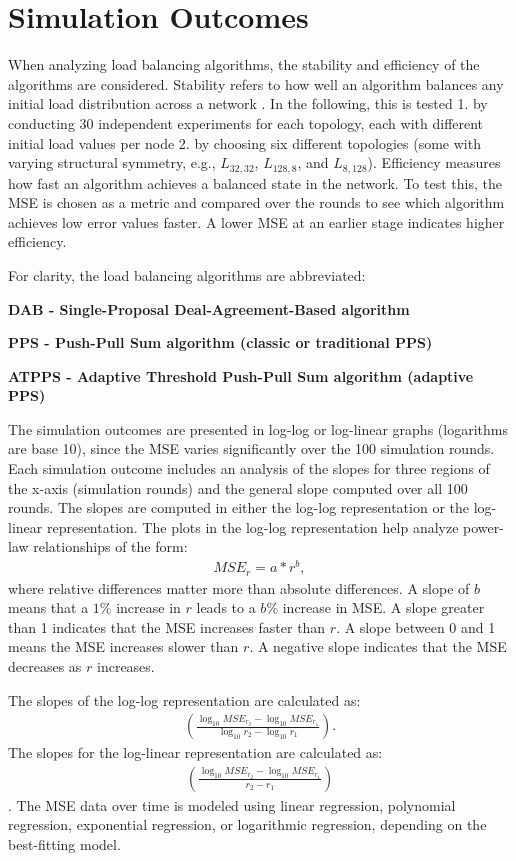 \chapter{Simulation Outcomes}\label{chap:simulationoutcomes}
When analyzing load balancing algorithms, the stability and efficiency of the algorithms are considered. Stability refers to how well an algorithm balances any initial load distribution across a network \cite{ChengzhongFrancis}. In the following, this is tested 1. by conducting 30 independent experiments for each topology, each with different initial load values per node 2. by choosing six different topologies (some with varying structural symmetry, e.g., $L_{32,32}$, $L_{128,8}$, and $L_{8,128}$). Efficiency measures how fast an algorithm achieves a balanced state in the network. To test this, the MSE is chosen as a metric and compared over the rounds to see which algorithm achieves low error values faster. A lower MSE at an earlier stage indicates higher efficiency.

For clarity, the load balancing algorithms are abbreviated:

\textbf{DAB - Single-Proposal Deal-Agreement-Based algorithm}

\textbf{PPS - Push-Pull Sum algorithm (classic or traditional PPS)}

\textbf{ATPPS - Adaptive Threshold Push-Pull Sum algorithm (adaptive PPS)}

The simulation outcomes are presented in log-log or log-linear graphs (logarithms are base 10), since the MSE varies significantly over the 100 simulation rounds. Each simulation outcome includes an analysis of the slopes for three regions of the x-axis (simulation rounds) and the general slope computed over all 100 rounds. The slopes are computed in either the log-log representation or the log-linear representation. The plots in the log-log representation help analyze power-law relationships of the form:
\begin{align}
    MSE_r=a*r^{b},
\end{align}
where relative differences matter more than absolute differences. A slope of $b$ means that a $1\%$ increase in $r$ leads to a $b\%$ increase in MSE. A slope greater than 1 indicates that the MSE increases faster than $r$. A slope between 0 and 1 means the MSE increases slower than $r$. A negative slope indicates that the MSE decreases as $r$ increases. \cite{sabin2022master}

The slopes of the log-log representation are calculated as:
\begin{align}
    (\frac{\log_{10}{{MSE_{r_2}}-\log_{10}{MSE_{r_1}}}}{\log_{10}{r_2} - \log_{10}{r_1}}).
\end{align} 
The slopes for the log-linear representation are calculated as:
\begin{align}
    (\frac{\log_{10}{{MSE_{r_2}}-\log_{10}{MSE_{r_1}}}}{r_2 - r_1})
\end{align}
\cite{lorenzo_graphing}.
The MSE data over time is modeled using linear regression, polynomial regression, exponential regression, or logarithmic regression, depending on the best-fitting model.

